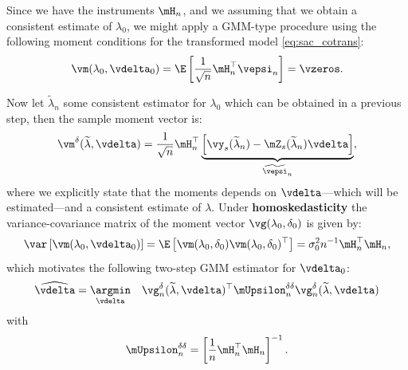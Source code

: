 \documentclass[english,12pt]{book}\usepackage[]{graphicx}\usepackage[]{xcolor}
\begin{document}
Since we have the instruments $\mH_n$, and we assuming that we obtain a consistent estimate of $\lambda_0$, we might apply a GMM-type procedure using the following moment conditions for the transformed model \eqref{eq:sac_cotrans}:
\begin{equation*}
  \vm(\lambda_0, \vdelta_0) = \E\left[\frac{1}{\sqrt{n}}\mH_n^\top\vepsi_n\right] = \vzeros.
\end{equation*}

Now let $\widetilde{\lambda}_n$ some consistent estimator for $\lambda_0$ which can be obtained in a previous step, then the sample moment vector is:
\begin{equation*}
  \vm^{\delta}(\widetilde{\lambda}, \vdelta) = \frac{1}{\sqrt{n}}\mH^\top_n\underbrace{\left[\vy_s(\widetilde{\lambda}_n) - \mZ_s(\widetilde{\lambda}_n)\vdelta\right]}_{\widetilde{\vepsi}_n},
\end{equation*}
%
where we explicitly state that the moments depends on $\vdelta$---which will be estimated---and a consistent estimate of $\lambda$. Under \textbf{homoskedasticity} the variance-covariance matrix of the moment vector $\vg(\lambda_0, \delta_0)$ is given by:
\begin{equation*}
  \var\left[\vm(\lambda_0, \vdelta_0)\right] = \E\left[\vm(\lambda_0, \delta_0)\vm(\lambda_0, \delta_0)^\top\right] = \sigma^2_0n^{-1}\mH^\top_n\mH_n,
\end{equation*}
%
which motivates the following two-step GMM estimator for $\vdelta_0$:
\begin{equation*}
  \widehat{\vdelta} = \underset{\vdelta}{\argmin}\quad \vg^{\delta}_n(\widetilde{\lambda}, \vdelta)^\top \mUpsilon^{\delta\delta}_n\vg^{\delta}_n(\widetilde{\lambda}, \vdelta)
\end{equation*}
%
with
\begin{equation*}
\mUpsilon^{\delta\delta}_n = \left[\frac{1}{n}\mH^\top_n\mH_n\right]^{-1}.
\end{equation*}
\end{document}
